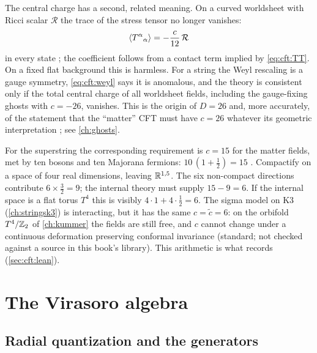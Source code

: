 The central charge has a second, related meaning. On a curved worldsheet with Ricci scalar
$\mathcal R$ the trace of the stress tensor no longer vanishes:
\begin{equation}\label{eq:cft:weyl}
  \langle T^\alpha{}_\alpha\rangle=-\frac{c}{12}\,\mathcal R
\end{equation}
in every state ; the coefficient follows from
a contact term implied by \eqref{eq:cft:TT}. On a fixed flat background this is harmless. For a
string the Weyl rescaling is a gauge symmetry, \eqref{eq:cft:weyl} says it is anomalous, and the
theory is consistent only if the total central charge of all worldsheet fields, including the
gauge-fixing ghosts with $c=-26$, vanishes. This is the origin of $D=26$ and, more accurately, of
the statement that the ``matter'' CFT must have $c=26$ whatever its geometric interpretation
; see \cref{ch:ghosts}.

\begin{example}\label{ex:cft:k3}
For the superstring the corresponding requirement is $c=15$ for the matter fields, met by ten
bosons and ten Majorana fermions: $10\,(1+\tfrac12)=15$ .
Compactify on a space of four real dimensions, leaving $\mathbb{R}^{1,5}$. The six non-compact
directions contribute $6\times\tfrac32=9$; the internal theory must supply $15-9=6$. If the
internal space is a flat torus $T^4$ this is visibly $4\cdot1+4\cdot\tfrac12=6$. The sigma model
on K3 (\cref{ch:stringsk3}) is interacting, but it has the same $c=\tilde c=6$: on the orbifold
$T^4/\mathbb{Z}_2$ of \cref{ch:kummer} the fields are still free, and $c$ cannot change under a continuous
deformation preserving conformal invariance (standard; not checked against a source in this
book's library). This arithmetic is what  records
(\cref{sec:cft:lean}).
\end{example}

\section{The Virasoro algebra}\label{sec:cft:virasoro}

\subsection{Radial quantization and the generators}

